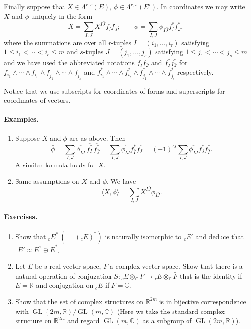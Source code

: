 Finally suppose that $X\in\Lambda^{r,s}(E)$, $\phi\in\Lambda^{r,s}(E')$. In coordinates we may write $X$ and $\phi$ uniquely in the form
\[
X=\sum_{I,J}X^{I\bar J}f_I f_{\bar J};\qquad\phi=\sum_{I,J}\phi_{I\bar J}f_I^*f_{\bar J}^*,
\]
where the summations are over all $r$-tuples $I=(i_1,\ldots,i_r)$ satisfying $1\leq i_1<\cdots<i_r\leq m$ and $s$-tuples $J=(j_1,\ldots,j_s)$ satisfying
$1\leq j_1<\cdots<j_s\leq m$ and we have used the abbreviated notations $f_If_{\bar J}$ and $f_I^*f_{\bar J}^*$ for $f_{i_1}\wedge\cdots\wedge f_{i_r}\wedge f_{\bar j_1}\wedge\cdots\wedge f_{\bar j_s}$ and $f_{i_1}^*\wedge\cdots\wedge f_{i_r}^*\wedge f_{\bar j_1}^*\wedge\cdots\wedge f_{\bar j_s}^*$ respectively.

Notice that we use subscripts for coordinates of forms and superscripts for coordinates of vectors.
\paragraph{Examples.}
\begin{enumerate}
\item Suppose $X$ and $\phi$ are as above. Then
\[
\bar\phi=\sum_{I,J}\overline{\phi_{I\bar J}}\,\overline{f_I^*}\,\overline{f_{\bar J}^*}
=\sum_{I,J}\overline{\phi_{I\bar J}}f_{\bar I}^*f_J^*
=(-1)^{rs}\sum_{I,J}\overline{\phi_{I\bar J}}f_J^*f_{\bar I}^*.
\]
A similar formula holds for $\bar X$.
\item Same assumptions on $X$ and $\phi$. We have
\[\langle X,\phi\rangle=\sum_{I,J}X^{I\bar J}\phi_{I\bar J}.\]
\end{enumerate}
\paragraph{Exercises.}
\begin{enumerate}
\item Show that ${}_cE^*\ (=({}_cE)^*)$ is naturally isomorphic to ${}_cE'$ and deduce that ${}_cE'\approx E^*\oplus\bar E^*$.
\item Let $E$ be a real vector space, $F$ a complex vector space. Show that there is a natural operation of conjugation $S:{}_cE\otimes_{\mathbb C}F\to{}_cE\otimes_{\mathbb C}\bar F$ that is the identity if $E=\mathbb R$ and conjugation on ${}_cE$ if $F=\mathbb C$.
\item Show that the set of complex structures on $\mathbb R^{2m}$ is in bijective correspondence with $\operatorname{GL}(2m,\mathbb R)/\operatorname{GL}(m,\mathbb C)$ (Here we take the standard complex structure on $\mathbb R^{2m}$ and regard $\operatorname{GL}(m,\mathbb C)$ as a subgroup of $\operatorname{GL}(2m,\mathbb R)$).
\end{enumerate}
